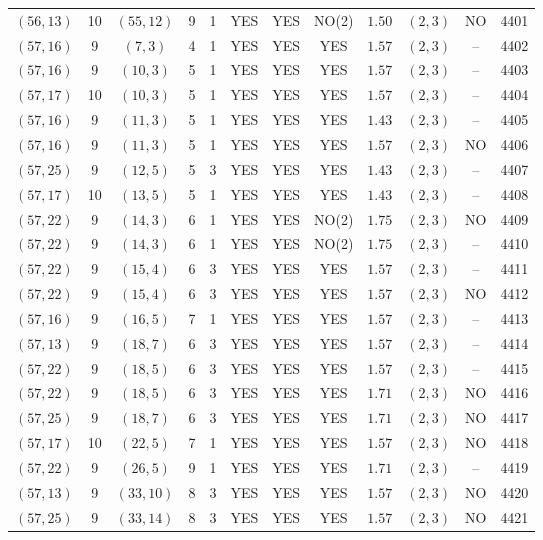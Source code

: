 \begin{longtable}{|c|c|c|c|c|c|c|c|c|c|c|c|}
$(56,13)$ & 10 & $(55,12)$ & 9 & 1 & YES & YES & NO(2) & $1.50$ & $(2,3)$ & NO & 4401\\
$(57,16)$ & 9 & $(7,3)$ & 4 & 1 & YES & YES & YES & $1.57$ & $(2,3)$ & -- & 4402\\
$(57,16)$ & 9 & $(10,3)$ & 5 & 1 & YES & YES & YES & $1.57$ & $(2,3)$ & -- & 4403\\
$(57,17)$ & 10 & $(10,3)$ & 5 & 1 & YES & YES & YES & $1.57$ & $(2,3)$ & -- & 4404\\
$(57,16)$ & 9 & $(11,3)$ & 5 & 1 & YES & YES & YES & $1.43$ & $(2,3)$ & -- & 4405\\
$(57,16)$ & 9 & $(11,3)$ & 5 & 1 & YES & YES & YES & $1.57$ & $(2,3)$ & NO & 4406\\
$(57,25)$ & 9 & $(12,5)$ & 5 & 3 & YES & YES & YES & $1.43$ & $(2,3)$ & -- & 4407\\
$(57,17)$ & 10 & $(13,5)$ & 5 & 1 & YES & YES & YES & $1.43$ & $(2,3)$ & -- & 4408\\
$(57,22)$ & 9 & $(14,3)$ & 6 & 1 & YES & YES & NO(2) & $1.75$ & $(2,3)$ & NO & 4409\\
$(57,22)$ & 9 & $(14,3)$ & 6 & 1 & YES & YES & NO(2) & $1.75$ & $(2,3)$ & -- & 4410\\
$(57,22)$ & 9 & $(15,4)$ & 6 & 3 & YES & YES & YES & $1.57$ & $(2,3)$ & -- & 4411\\
$(57,22)$ & 9 & $(15,4)$ & 6 & 3 & YES & YES & YES & $1.57$ & $(2,3)$ & NO & 4412\\
$(57,16)$ & 9 & $(16,5)$ & 7 & 1 & YES & YES & YES & $1.57$ & $(2,3)$ & -- & 4413\\
$(57,13)$ & 9 & $(18,7)$ & 6 & 3 & YES & YES & YES & $1.57$ & $(2,3)$ & -- & 4414\\
$(57,22)$ & 9 & $(18,5)$ & 6 & 3 & YES & YES & YES & $1.57$ & $(2,3)$ & -- & 4415\\
$(57,22)$ & 9 & $(18,5)$ & 6 & 3 & YES & YES & YES & $1.71$ & $(2,3)$ & NO & 4416\\
$(57,25)$ & 9 & $(18,7)$ & 6 & 3 & YES & YES & YES & $1.71$ & $(2,3)$ & NO & 4417\\
$(57,17)$ & 10 & $(22,5)$ & 7 & 1 & YES & YES & YES & $1.57$ & $(2,3)$ & NO & 4418\\
$(57,22)$ & 9 & $(26,5)$ & 9 & 1 & YES & YES & YES & $1.71$ & $(2,3)$ & -- & 4419\\
$(57,13)$ & 9 & $(33,10)$ & 8 & 3 & YES & YES & YES & $1.57$ & $(2,3)$ & NO & 4420\\
$(57,25)$ & 9 & $(33,14)$ & 8 & 3 & YES & YES & YES & $1.57$ & $(2,3)$ & NO & 4421\\

\end{longtable}

